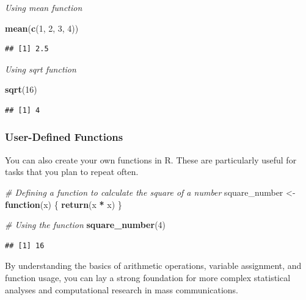 \documentclass[
  b5paper]{book}
\newenvironment{Shaded}{\begin{snugshade}}{\end{snugshade}}
\newcommand{\CommentTok}[1]{\textcolor[rgb]{0.56,0.35,0.01}{\textit{#1}}}
\newcommand{\ControlFlowTok}[1]{\textcolor[rgb]{0.13,0.29,0.53}{\textbf{#1}}}
\newcommand{\DecValTok}[1]{\textcolor[rgb]{0.00,0.00,0.81}{#1}}
\newcommand{\FunctionTok}[1]{\textcolor[rgb]{0.13,0.29,0.53}{\textbf{#1}}}
\newcommand{\NormalTok}[1]{#1}
\newcommand{\OtherTok}[1]{\textcolor[rgb]{0.56,0.35,0.01}{#1}}
\newcommand{\SpecialCharTok}[1]{\textcolor[rgb]{0.81,0.36,0.00}{\textbf{#1}}}
\begin{document}
\emph{Using mean function}

\begin{Shaded}
\begin{Highlighting}[]
\FunctionTok{mean}\NormalTok{(}\FunctionTok{c}\NormalTok{(}\DecValTok{1}\NormalTok{, }\DecValTok{2}\NormalTok{, }\DecValTok{3}\NormalTok{, }\DecValTok{4}\NormalTok{))}
\end{Highlighting}
\end{Shaded}

\begin{verbatim}
## [1] 2.5
\end{verbatim}

\emph{Using sqrt function}

\begin{Shaded}
\begin{Highlighting}[]
\FunctionTok{sqrt}\NormalTok{(}\DecValTok{16}\NormalTok{)}
\end{Highlighting}
\end{Shaded}

\begin{verbatim}
## [1] 4
\end{verbatim}

\hypertarget{user-defined-functions}{%
\subsubsection*{User-Defined Functions}\label{user-defined-functions}}

You can also create your own functions in R. These are particularly useful for tasks that you plan to repeat often.

\begin{Shaded}
\begin{Highlighting}[]
\CommentTok{\# Defining a function to calculate the square of a number}
\NormalTok{square\_number }\OtherTok{\textless{}{-}} \ControlFlowTok{function}\NormalTok{(x) \{}
  \FunctionTok{return}\NormalTok{(x }\SpecialCharTok{*}\NormalTok{ x)}
\NormalTok{\}}

\CommentTok{\# Using the function}
\FunctionTok{square\_number}\NormalTok{(}\DecValTok{4}\NormalTok{)}
\end{Highlighting}
\end{Shaded}

\begin{verbatim}
## [1] 16
\end{verbatim}

By understanding the basics of arithmetic operations, variable assignment, and function usage, you can lay a strong foundation for more complex statistical analyses and computational research in mass communications.
\end{document}
